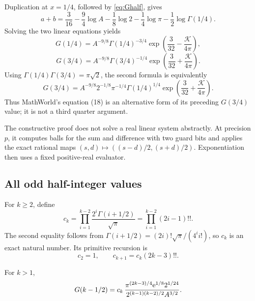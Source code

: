 Duplication at \(x=1/4\), followed by \cref{eq:Ghalf}, gives
\begin{equation}\label{eq:quarter-sum}
 a+b=\frac3{16}-\frac94\log A-\frac18\log2
 -\frac14\log\pi-\frac12\log\Gamma(1/4).
\end{equation}
Solving the two linear equations yields
\begin{equation}\label{eq:Gquarter}
 G(1/4)=A^{-9/8}\Gamma(1/4)^{-3/4}
 \exp\!\left(\frac3{32}-\frac{\mathcal K}{4\pi}\right),
\end{equation}
\begin{equation}\label{eq:Gthreequarter}
 G(3/4)=A^{-9/8}\Gamma(3/4)^{-1/4}
 \exp\!\left(\frac3{32}+\frac{\mathcal K}{4\pi}\right).
\end{equation}
Using
\(\Gamma(1/4)\Gamma(3/4)=\pi\sqrt2\), the second formula is equivalently
\begin{equation}\label{eq:Gthreequarter-alt}
 G(3/4)=A^{-9/8}2^{-1/8}\pi^{-1/4}
 \Gamma(1/4)^{1/4}
 \exp\!\left(\frac3{32}+\frac{\mathcal K}{4\pi}\right).
\end{equation}
Thus MathWorld's equation (18) is an alternative form of its preceding
\(G(3/4)\) value; it is not a third quarter argument.

The constructive proof does not solve a real linear system abstractly.  At
precision \(p\), it computes balls for the sum and difference with two guard
bits and applies the exact rational maps \((s,d)\mapsto((s-d)/2,(s+d)/2)\).
Exponentiation then uses a fixed positive-real evaluator.

\subsection{All odd half-integer values}

For \(k\ge2\), define
\begin{equation}\label{eq:ck}
 c_k=\prod_{i=1}^{k-2}
 \frac{2^i\Gamma(i+1/2)}{\sqrt\pi}
 =\prod_{i=1}^{k-2}(2i-1)!!.
\end{equation}
The second equality follows from
\(
\Gamma(i+1/2)=(2i)!\sqrt\pi/(4^ii!)
\), so \(c_k\) is an exact natural number.  Its primitive recursion is
\begin{equation}\label{eq:ck-rec}
 c_2=1,
 \qquad
 c_{k+1}=c_k(2k-3)!!.
\end{equation}

\begin{theorem}\label{thm:odd-half}
For \(k>1\),
\begin{equation}\label{eq:odd-half}
 G(k-1/2)=
 c_k\,
 \frac{\pi^{(2k-3)/4}\mathrm e^{1/8}2^{1/24}}
      {2^{(k-1)(k-2)/2}A^{3/2}}.
\end{equation}
\end{theorem}

